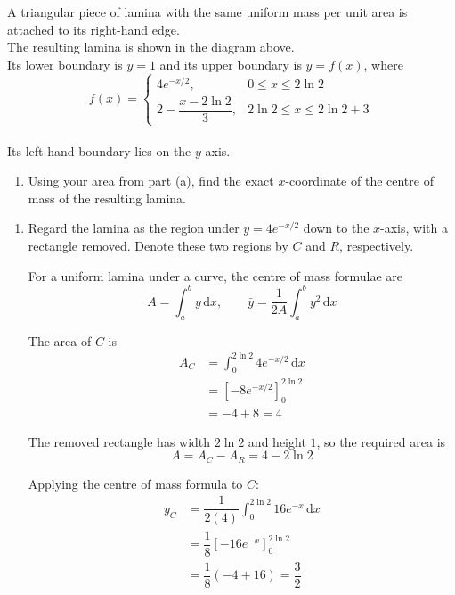 \documentclass[leqno]{article}
\begin{document}
\begin{enumerate}[
  label=\textbf{\arabic*.},
  leftmargin=*,
  topsep=0pt,
  partopsep=0pt,
  parsep=0pt
]
A triangular piece of lamina with the same uniform mass per unit area is attached to its right-hand edge. \\
The resulting lamina is shown in the diagram above. \\
Its lower boundary is $y=1$ and its upper boundary is $y=f(x)$, where
\[
f(x)=\begin{cases}
4e^{-x/2}, & 0\leq x\leq 2\ln 2\\[3pt]
2-\dfrac{x-2\ln 2}{3}, & 2\ln 2\leq x\leq 2\ln 2+3
\end{cases}
\] \\
Its left-hand boundary lies on the $y$-axis. \\
\begin{enumerate}[label=\textbf{(\alph*)}, resume]
\item Using your area from part (a), find the exact $x$-coordinate of the centre of mass of the resulting lamina.  \\
\end{enumerate}

\vspace*{10pt}

\begin{djsSolution}
\begin{enumerate}[label=\textbf{(\alph*)}, start=1]
\item Regard the lamina as the region under \(y=4e^{-x/2}\) down to the \(x\)-axis, with a rectangle removed. Denote these two regions by \(C\) and \(R\), respectively.

For a uniform lamina under a curve, the centre of mass formulae are
\[
A=\int_a^b y\,\mathrm{d}x,
\qquad
\bar{y}=\frac{1}{2A}\int_a^b y^2\,\mathrm{d}x
\]

The area of \(C\) is
\begin{align*}
A_C&=\int_0^{2\ln 2}4e^{-x/2}\,\mathrm{d}x\\
&=\left[-8e^{-x/2}\right]_0^{2\ln 2}\\
&=-4+8=4
\end{align*}

The removed rectangle has width \(2\ln 2\) and height \(1\), so the required area is
\[
A=A_C-A_R=4-2\ln 2
\]

Applying the centre of mass formula to \(C\):
\begin{align*}
y_C&=\dfrac{1}{2(4)}\int_0^{2\ln 2}16e^{-x}\,\mathrm{d}x\\
&=\dfrac18\left[-16e^{-x}\right]_0^{2\ln 2}\\
&=\dfrac18(-4+16)=\dfrac32
\end{align*}


\end{enumerate}
\end{djsSolution}
\end{enumerate}
\end{document}
